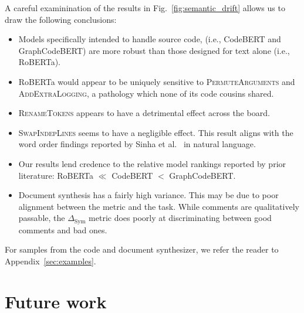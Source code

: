 \documentclass[usenames,dvipsnames]{article} %
\begin{document}
  A careful examinination of the results in Fig.~\ref{fig:semantic_drift} allows us to draw the following conclusions:

  \begin{itemize}
    \item Models specifically intended to handle source code, (i.e., CodeBERT and GraphCodeBERT) are more robust than those designed for text alone (i.e., RoBERTa).
    \item RoBERTa would appear to be uniquely sensitive to \textsc{PermuteArguments} and \textsc{AddExtraLogging}, a pathology which none of its code cousins shared.
    \item \textsc{RenameTokens} appears to have a detrimental effect across the board.
    \item \textsc{SwapIndepLines} seems to have a negligible effect. This result aligns with the word order findings reported by Sinha et al.~\citep{sinha2021masked} in natural language.
    \item Our results lend credence to the relative model rankings reported by prior literature: RoBERTa $\ll$ CodeBERT $<$ GraphCodeBERT.
    \item Document synthesis has a fairly high variance. This may be due to poor alignment between the metric and the task. While comments are qualitatively passable, the $\Delta_{\text{Sym}}$ metric does poorly at discriminating between good comments and bad ones.
  \end{itemize}

 For samples from the code and document synthesizer, we refer the reader to Appendix~\ref{sec:examples}.

  \section{Future work}

\end{document}
